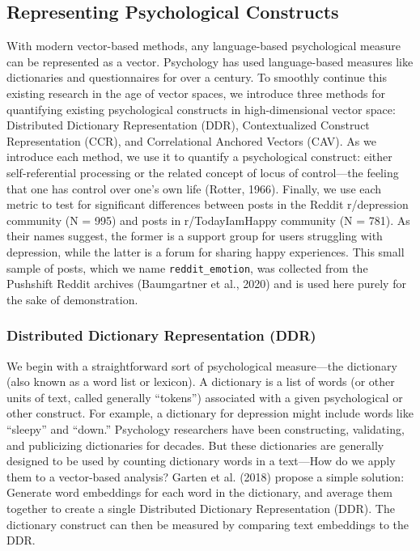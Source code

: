 \documentclass[
  man,
  floatsintext,
  longtable,
  nolmodern,
  notxfonts,
  notimes,
  colorlinks=true,linkcolor=blue,citecolor=blue,urlcolor=blue]{apa7}
\begin{document}
\subsection{Representing Psychological
Constructs}\label{representing-psychological-constructs}

With modern vector-based methods, any language-based psychological
measure can be represented as a vector. Psychology has used
language-based measures like dictionaries and questionnaires for over a
century. To smoothly continue this existing research in the age of
vector spaces, we introduce three methods for quantifying existing
psychological constructs in high-dimensional vector space: Distributed
Dictionary Representation (DDR), Contextualized Construct Representation
(CCR), and Correlational Anchored Vectors (CAV). As we introduce each
method, we use it to quantify a psychological construct: either
self-referential processing or the related concept of locus of
control---the feeling that one has control over one's own life (Rotter,
1966). Finally, we use each metric to test for significant differences
between posts in the Reddit r/depression community (N = 995) and posts
in r/TodayIamHappy community (N = 781). As their names suggest, the
former is a support group for users struggling with depression, while
the latter is a forum for sharing happy experiences. This small sample
of posts, which we name \texttt{reddit\_emotion}, was collected from the
Pushshift Reddit archives (Baumgartner et al., 2020) and is used here
purely for the sake of demonstration.

\subsubsection{Distributed Dictionary Representation
(DDR)}\label{distributed-dictionary-representation-ddr}

We begin with a straightforward sort of psychological measure---the
dictionary (also known as a word list or lexicon). A dictionary is a
list of words (or other units of text, called generally ``tokens'')
associated with a given psychological or other construct. For example, a
dictionary for depression might include words like ``sleepy'' and
``down.'' Psychology researchers have been constructing, validating, and
publicizing dictionaries for decades. But these dictionaries are
generally designed to be used by counting dictionary words in a
text---How do we apply them to a vector-based analysis? Garten et al.
(2018) propose a simple solution: Generate word embeddings for each word
in the dictionary, and average them together to create a single
Distributed Dictionary Representation (DDR). The dictionary construct
can then be measured by comparing text embeddings to the DDR.
\end{document}

